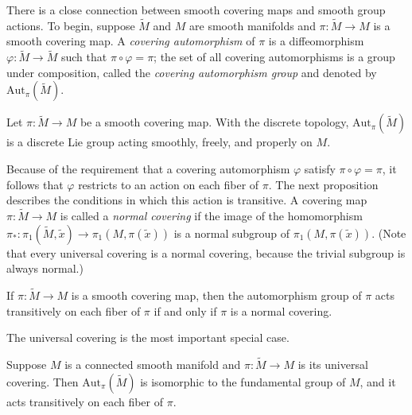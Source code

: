 There is a close connection between smooth covering maps and smooth group actions. To begin, suppose $\tilde{M}$ and $M$ are smooth manifolds and $\pi: \tilde{M} \to M$ is a smooth covering map. A \emph{covering automorphism} of $\pi$ is a diffeomorphism $\varphi: \widetilde{M} \to \widetilde{M}$ such that $\pi \circ \varphi = \pi$; the set of all covering automorphisms is a group under composition, called the \emph{covering automorphism group} and denoted by $\mathrm{Aut}_\pi(\widetilde{M})$.

\begin{proposition}\label{prop:covering-automorphisms-discrete-lie-group}

Let $\pi: \widetilde{M} \to M$ be a smooth covering map. With the discrete topology, $\mathrm{Aut}_\pi(\widetilde{M})$ is a discrete Lie group acting smoothly, freely, and properly on $M$.
\end{proposition}

Because of the requirement that a covering automorphism $\varphi$ satisfy $\pi \circ \varphi = \pi$, it follows that $\varphi$ restricts to an action on each fiber of $\pi$. The next proposition describes the conditions in which this action is transitive. A covering map $\pi: \widetilde{M} \to M$ is called a \emph{normal covering} if the image of the homomorphism $\pi_*: \pi_1(\widetilde{M}, \widetilde{x}) \to \pi_1(M, \pi(\widetilde{x}))$ is a normal subgroup of $\pi_1(M, \pi(\widetilde{x}))$. (Note that every universal covering is a normal covering, because the trivial subgroup is always normal.)

\begin{proposition}\label{prop:normal-covering-transitive-action}

If $\pi: \widetilde{M} \to M$ is a smooth covering map, then the automorphism group of $\pi$ acts transitively on each fiber of $\pi$ if and only if $\pi$ is a normal covering.
\end{proposition}

The universal covering is the most important special case.

\begin{proposition}\label{prop:automorphisms-universal-covering}

Suppose $M$ is a connected smooth manifold and $\pi: \widetilde{M} \to M$ is its universal covering. Then $\mathrm{Aut}_\pi(\widetilde{M})$ is isomorphic to the fundamental group of $M$, and it acts transitively on each fiber of $\pi$.
\end{proposition}

